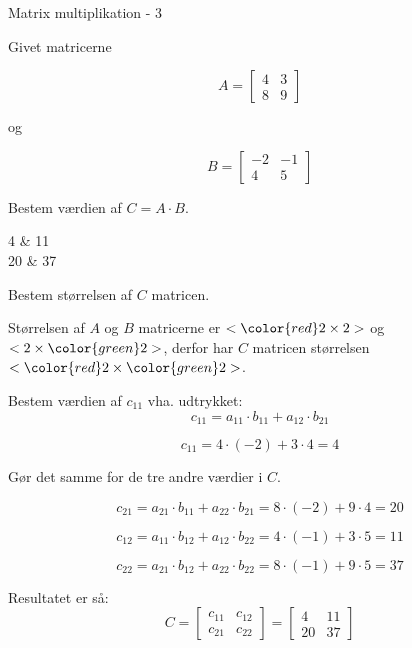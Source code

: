 \documentclass{article}
\begin{document}
\newpage

\begin{exercise}{Matrix multiplikation - 3}
	
	Givet matricerne 
	
	\[
	A = \left[\begin{array}{rr}
	4 & 3 \\ 
	8 & 9 
	\end{array} \right]
	\]
	
	og 
	
	\[
	B = \left[\begin{array}{rr}
	-2 & -1 \\ 
	4 & 5 
	\end{array} \right]
	\]
	
	Bestem værdien af $C = A \cdot B$.
	
	\begin{answermatrix}
		4 & 11  \\
		20 & 37 
	\end{answermatrix}
	
	\hint
	Bestem størrelsen af $C$ matricen.
	
	\hint
	Størrelsen af $A$ og $B$ matricerne er $<{\color{red} 2} \times 2>$ og $<2 \times {\color{green}2}>$, 
	derfor har $C$ matricen størrelsen $<{\color{red} 2} \times {\color{green}2}>$.
	
	\hint
	Bestem værdien af $c_{11}$ vha. udtrykket:
	\[
	c_{11} = a_{11} \cdot b_{11} + a_{12} \cdot b_{21}
	\]
	
	\hint
	\[
	c_{11} = 4 \cdot (-2) + 3 \cdot 4 = 4
	\]
	
	\hint
	Gør det samme for de tre andre værdier i $C$.
	
	\hint
	\[
		c_{21} = a_{21} \cdot b_{11} + a_{22} \cdot b_{21} = 8 \cdot (-2) + 9 \cdot 4 = 20
	\]
	
	\hint
	\[
		c_{12} = a_{11} \cdot b_{12} + a_{12} \cdot b_{22} = 4 \cdot (-1) + 3 \cdot 5 = 11
	\]
	
	\hint
	\[
		c_{22} = a_{21} \cdot b_{12} + a_{22} \cdot b_{22} = 8 \cdot (-1) + 9 \cdot 5 = 37
	\]
	
	
	\hint
	Resultatet er så:
	\[
	C = \left[\begin{array}{rr}
	c_{11} & c_{12} \\
	c_{21} & c_{22} 
	\end{array} \right] = 
	\left[\begin{array}{rr}
	4 & 11 \\
	20 & 37 
	\end{array} \right]
	\]
	
	
\end{exercise}
\end{document}
